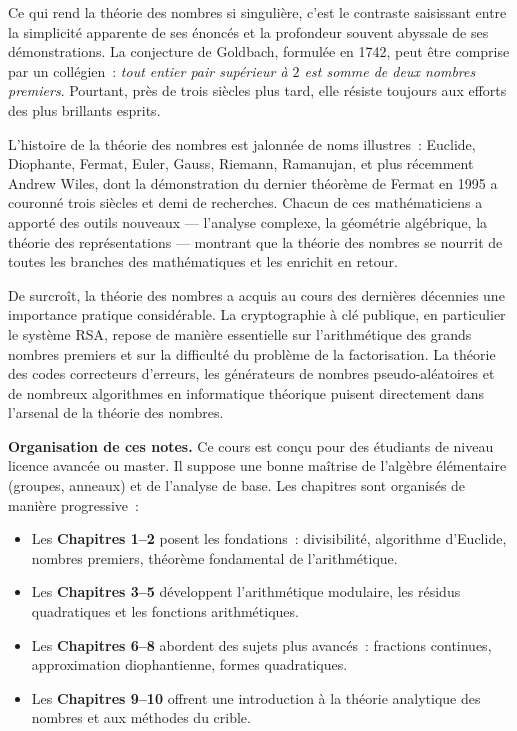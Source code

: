 \documentclass[12pt,a4paper,openany]{book}
\theoremstyle{definition}
\theoremstyle{plain}
\theoremstyle{remark}
\begin{document}
Ce qui rend la théorie des nombres si singulière, c'est le contraste saisissant entre
la simplicité apparente de ses énoncés et la profondeur souvent abyssale de ses
démonstrations. La conjecture de Goldbach, formulée en 1742,
peut être comprise par un collégien~: \emph{tout entier pair supérieur à $2$ est somme de
deux nombres premiers}. Pourtant, près de trois siècles plus tard, elle résiste
toujours aux efforts des plus brillants esprits.

L'histoire de la théorie des nombres est jalonnée de noms illustres~:
Euclide, Diophante, Fermat,
Euler, Gauss,
Riemann, Ramanujan, et plus
récemment Andrew Wiles, dont la démonstration du dernier théorème
de Fermat en 1995 a couronné trois siècles et demi de recherches. Chacun de ces
mathématiciens a apporté des outils nouveaux --- l'analyse complexe, la géométrie
algébrique, la théorie des représentations --- montrant que la théorie des nombres
se nourrit de toutes les branches des mathématiques et les enrichit en retour.

De surcroît, la théorie des nombres a acquis au cours des dernières décennies une
importance pratique considérable. La cryptographie à clé publique,
en particulier le système RSA, repose de manière essentielle sur
l'arithmétique des grands nombres premiers et sur la difficulté du problème de la
factorisation. La théorie des codes correcteurs d'erreurs, les générateurs de nombres
pseudo-aléatoires et de nombreux algorithmes en informatique théorique puisent
directement dans l'arsenal de la théorie des nombres.

\medskip

\noindent\textbf{Organisation de ces notes.}
Ce cours est conçu pour des étudiants de niveau licence avancée ou master. Il suppose
une bonne maîtrise de l'algèbre élémentaire (groupes, anneaux) et de l'analyse de
base. Les chapitres sont organisés de manière progressive~:

\begin{itemize}[leftmargin=2cm]
  \item Les \textbf{Chapitres 1--2} posent les fondations~: divisibilité, algorithme
    d'Euclide, nombres premiers, théorème fondamental de l'arithmétique.
  \item Les \textbf{Chapitres 3--5} développent l'arithmétique modulaire, les
    résidus quadratiques et les fonctions arithmétiques.
  \item Les \textbf{Chapitres 6--8} abordent des sujets plus avancés~: fractions
    continues, approximation diophantienne, formes quadratiques.
  \item Les \textbf{Chapitres 9--10} offrent une introduction à la théorie analytique
    des nombres et aux méthodes du crible.
\end{itemize}
\end{document}
